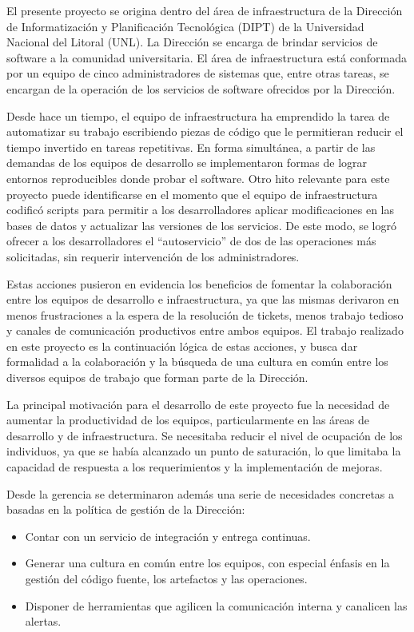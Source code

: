 El presente proyecto se origina dentro del área de infraestructura de
la Dirección de Informatización y Planificación Tecnológica (DIPT) de
la Universidad Nacional del Litoral (UNL). La Dirección se encarga de
brindar servicios de software a la comunidad universitaria. El área de
infraestructura está conformada por un equipo de cinco administradores
de sistemas que, entre otras tareas, se encargan de la operación de
los servicios de software ofrecidos por la Dirección.

Desde hace un tiempo, el equipo de infraestructura ha emprendido la
tarea de automatizar su trabajo escribiendo piezas de código que le
permitieran reducir el tiempo invertido en tareas repetitivas. En
forma simultánea, a partir de las demandas de los equipos de
desarrollo se implementaron formas de lograr entornos reproducibles
donde probar el software. Otro hito relevante para este proyecto puede
identificarse en el momento que el equipo de infraestructura codificó
scripts para permitir a los desarrolladores aplicar modificaciones en
las bases de datos y actualizar las versiones de los servicios. De
este modo, se logró ofrecer a los desarrolladores el ``autoservicio'' de
dos de las operaciones más solicitadas, sin requerir intervención de
los administradores.

Estas acciones pusieron en evidencia los beneficios de fomentar la
colaboración entre los equipos de desarrollo e infraestructura, ya que
las mismas derivaron en menos frustraciones a la espera de la
resolución de tickets, menos trabajo tedioso y canales de comunicación
productivos entre ambos equipos. El trabajo realizado en este proyecto
es la continuación lógica de estas acciones, y busca dar formalidad a
la colaboración y la búsqueda de una cultura en común entre los
diversos equipos de trabajo que forman parte de la Dirección.

La principal motivación para el desarrollo de este proyecto fue la
necesidad de aumentar la productividad de los equipos, particularmente
en las áreas de desarrollo y de infraestructura. Se necesitaba reducir
el nivel de ocupación de los individuos, ya que se había alcanzado un
punto de saturación, lo que limitaba la capacidad de respuesta a los
requerimientos y la implementación de mejoras.

Desde la gerencia se determinaron además una serie de necesidades
concretas a basadas en la política de gestión de la Dirección:

\begin{itemize}
\item Contar con un servicio de integración y entrega continuas.
\item Generar una cultura en común entre los equipos, con especial
  énfasis en la gestión del código fuente, los artefactos y las
  operaciones.
\item Disponer de herramientas que agilicen la comunicación interna y
  canalicen las alertas.
\end{itemize}
